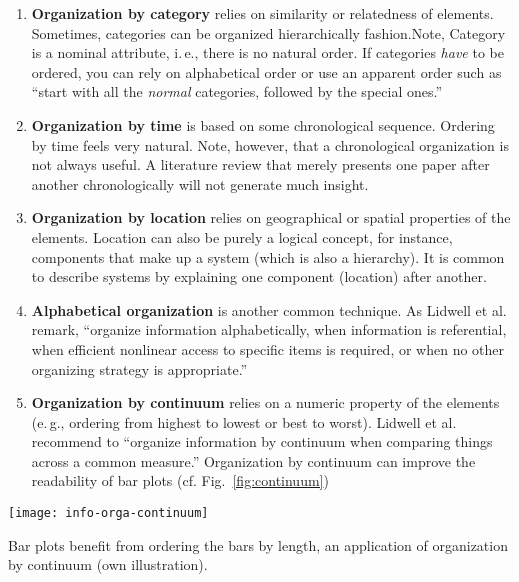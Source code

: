 \begin{enumerate}
\item \textbf{Organization by category} relies on similarity or relatedness of elements. Sometimes, categories can be organized hierarchically fashion.Note, Category is a nominal attribute, i.\,e., there is no natural order. If categories \emph{have} to be ordered, you can rely on alphabetical order or use an apparent order such as ``start with all the \emph{normal} categories, followed by the special ones.''

\item \textbf{Organization by time} is based on some chronological sequence. Ordering by time feels very natural. Note, however, that a chronological organization is not always useful. A literature review that merely presents one paper after another chronologically will not generate much insight.

\item \textbf{Organization by location} relies on geographical or spatial properties of the elements. Location can also be purely a logical concept, for instance, components that make up a system (which is also a hierarchy). It is common to describe systems by explaining one component (location) after another.

\item \textbf{Alphabetical organization} is another common technique. As Lidwell et al. \cite{Lidwell10} remark, ``organize information alphabetically, when information is referential, when efficient nonlinear access to specific items is required, or when no other organizing strategy is appropriate.''

\item \textbf{Organization by continuum} relies on a numeric property of the elements (e.\,g., ordering from highest to lowest or best to worst). Lidwell et al. \cite{Lidwell10} recommend to ``organize information by continuum when comparing things across a common measure.'' Organization by continuum can improve the readability of bar plots (cf. Fig.~\ref{fig:continuum})
\end{enumerate}


\begin{marginfigure}
\centering
\texttt{[image: info-orga-continuum]}
\caption{\label{fig:continuum} Bar plots benefit from ordering the bars by length, an application of organization by continuum (own illustration).}%
\end{marginfigure}


